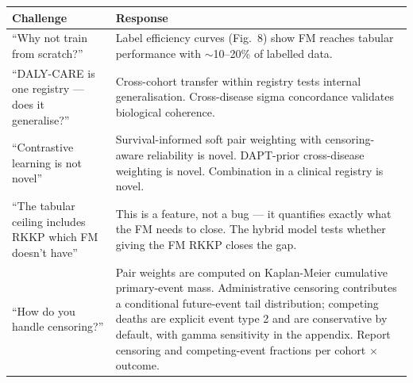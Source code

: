 \documentclass[11pt, a4paper]{article}
\begin{document}
\begin{center}
\begin{tabularx}{\textwidth}{lX}
  \toprule
  \textbf{Challenge} & \textbf{Response} \\
  \midrule
  ``Why not train from scratch?''
    & Label efficiency curves (Fig.~8) show FM reaches tabular
      performance with $\sim$10--20\% of labelled data. \\[4pt]
  ``DALY-CARE is one registry — does it generalise?''
    & Cross-cohort transfer within registry tests internal
      generalisation. Cross-disease sigma concordance validates
      biological coherence. \\[4pt]
  ``Contrastive learning is not novel''
    & Survival-informed soft pair weighting with censoring-aware
      reliability is novel. DAPT-prior cross-disease weighting
      is novel. Combination in a clinical registry is novel. \\[4pt]
  ``The tabular ceiling includes RKKP which FM doesn't have''
    & This is a feature, not a bug — it quantifies exactly what
      the FM needs to close. The hybrid model tests whether
      giving the FM RKKP closes the gap. \\[4pt]
  ``How do you handle censoring?''
    & Pair weights are computed on Kaplan-Meier cumulative primary-event
      mass. Administrative censoring contributes a conditional future-event
      tail distribution; competing deaths are explicit event type 2 and are
      conservative by default, with gamma sensitivity in the appendix. Report
      censoring and competing-event fractions per cohort $\times$ outcome. \\
  \bottomrule
\end{tabularx}
\end{center}
\end{document}
